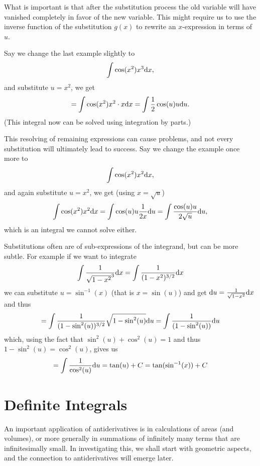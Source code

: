 What is important is that after the substitution process 
the old variable will have vanished completely in favor of the new variable.
This might require us to use the inverse function of the substitution $g(x)$
to rewrite an $x$-expression in terms of $u$.

Say we change the last example slightly to
\[
\int\cos(x^2)x^3{\mbox{d}}x,
\]
and substitute $u=x^2$, we get
\[
=\int\cos(x^2) x^2\cdot x{\mbox{d}}x=\int\frac12 \cos(u)u{\mbox{d}}u.
\]
(This integral now can be solved using integration by parts.)

This resolving of remaining expressions can cause problems, and not every
substitution will ultimately lead to success. Say we change the example once
more to
\[
\int\cos(x^2)x^2{\mbox{d}}x,
\]
and again substitute $u=x^2$, we get (using $x=\sqrt{u}$)
\[
\int\cos(x^2) x^2 {\mbox{d}}x=\int\cos(u)u\frac{1}{2x}{\mbox{d}}u
=\int\frac{\cos(u)u}{2\sqrt{u}}{\mbox{d}}u,
\]
which is an integral we cannot solve either.
\smallskip

Substitutions often are of sub-expressions of the integrand, but can be more
subtle. For example if we want to integrate
\[
\int \frac{1}{\sqrt{1-x^2}^3}{\mbox{d}}x
=\int \frac{1}{(1-x^2)^{3/2}}{\mbox{d}}x
\]
we can substitute $u=\sin^{-1}(x)$ (that is
$x=\sin(u)$) and get ${\mbox{d}}u=\frac{1}{\sqrt{1-x^2}}{\mbox{d}}x$ and thus
\[
=\int \frac{1}{(1-\sin^2(u))^{3/2}}\sqrt{1-\sin^2(u)}{\mbox{d}}u
=\int \frac{1}{(1-\sin^2(u))}{\mbox{d}}u
\]
which, using the fact that $\sin^2(u)+\cos^2(u)=1$ and thus
$1-\sin^2(u)=\cos^2(u)$, gives us
\[
=\int \frac{1}{\cos^2(u)}{\mbox{d}}u=\tan(u)+C=\tan(\sin^{-1}(x))+C
\]


\section{Definite Integrals}
\label{RiemannIntegral}

An important application of antiderivatives is in calculations of areas (and
volumes), or more generally in summations of infinitely many terms that are
infinitesimally small.
In investigating this, we shall start with geometric aspects, and the
connection to antiderivatives will emerge later.
\smallskip

